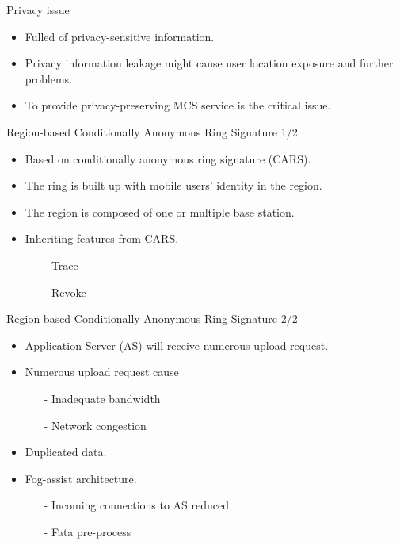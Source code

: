 \documentclass{beamer}
\begin{document}
\begin{frame}{Privacy issue}
    \begin{itemize}
        \item {Fulled of privacy-sensitive information.}
        \item {Privacy information leakage might cause user location exposure and further problems.}
        \item {To provide privacy-preserving MCS service is the critical issue.}
    \end{itemize}
\end{frame}
\begin{frame}{Region-based Conditionally Anonymous Ring Signature 1/2}
    \begin{itemize}
        \item {Based on  conditionally anonymous ring signature (CARS)\cite{Zeng12}.}
        \item {The ring is built up with mobile users' identity in the region.}
        \item {The region is composed of one or multiple base station.}
        \item {Inheriting features from CARS.}
        \begin{itemize}
            \item[-] Trace
            \item[-] Revoke
        \end{itemize}
    \end{itemize}
\end{frame}
\begin{frame}{Region-based Conditionally Anonymous Ring Signature 2/2}
    \begin{itemize}
        \item {Application Server (AS) will receive numerous upload request.}
        \item {Numerous upload request cause}
        \begin{itemize}
            \item[-] Inadequate bandwidth
            \item[-] Network congestion
        \end{itemize}
        \item {Duplicated data.}
        \item {Fog-assist architecture.}
        \begin{itemize}
            \item[-] Incoming connections to AS reduced
            \item[-] Fata pre-process
        \end{itemize}
    \end{itemize}
\end{frame}
\end{document}
